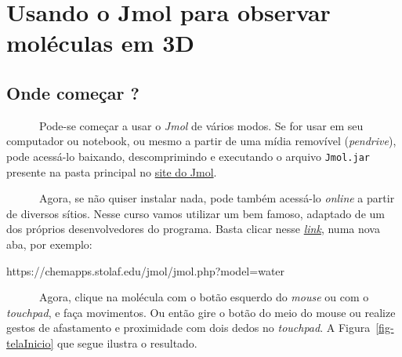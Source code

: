 \documentclass[
  letterpaper,
  DIV=11,
  numbers=noendperiod]{scrreprt}
\newenvironment{Shaded}{\begin{snugshade}}{\end{snugshade}}
\newcommand{\ErrorTok}[1]{\textcolor[rgb]{0.68,0.00,0.00}{#1}}
\newcommand{\NormalTok}[1]{\textcolor[rgb]{0.00,0.23,0.31}{#1}}
\newcommand{\OtherTok}[1]{\textcolor[rgb]{0.00,0.23,0.31}{#1}}
\newcommand{\SpecialCharTok}[1]{\textcolor[rgb]{0.37,0.37,0.37}{#1}}
\begin{document}

\chapter{Usando o Jmol para observar moléculas em
3D}\label{usando-o-jmol-para-observar-moluxe9culas-em-3d}

\section{Onde começar ?}\label{onde-comeuxe7ar}

~~~~~~Pode-se começar a usar o \emph{Jmol} de vários modos. Se for usar
em seu computador ou notebook, ou mesmo a partir de uma mídia removível
(\emph{pendrive}), pode acessá-lo baixando, descomprimindo e executando
o arquivo \texttt{Jmol.jar} presente na pasta principal no
\href{https://jmol.sourceforge.net/}{site do Jmol}.

~~~~~~Agora, se não quiser instalar nada, pode também acessá-lo
\emph{online} a partir de diversos sítios. Nesse curso vamos utilizar um
bem famoso, adaptado de um dos próprios desenvolvedores do programa.
Basta clicar nesse
\href{https://chemapps.stolaf.edu/jmol/jmol.php?model=water}{\emph{link}},
numa nova aba, por exemplo:

\begin{Shaded}
\begin{Highlighting}[]
\NormalTok{https}\SpecialCharTok{:}\ErrorTok{//}\NormalTok{chemapps.stolaf.edu}\SpecialCharTok{/}\NormalTok{jmol}\SpecialCharTok{/}\NormalTok{jmol.php?model}\OtherTok{=}\NormalTok{water}
\end{Highlighting}
\end{Shaded}

~~~~~~Agora, clique na molécula com o botão esquerdo do \emph{mouse} ou
com o \emph{touchpad}, e faça movimentos. Ou então gire o botão do meio
do mouse ou realize gestos de afastamento e proximidade com dois dedos
no \emph{touchpad}. A Figura~\ref{fig-telaInicio} que segue ilustra o
resultado.
\end{document}
